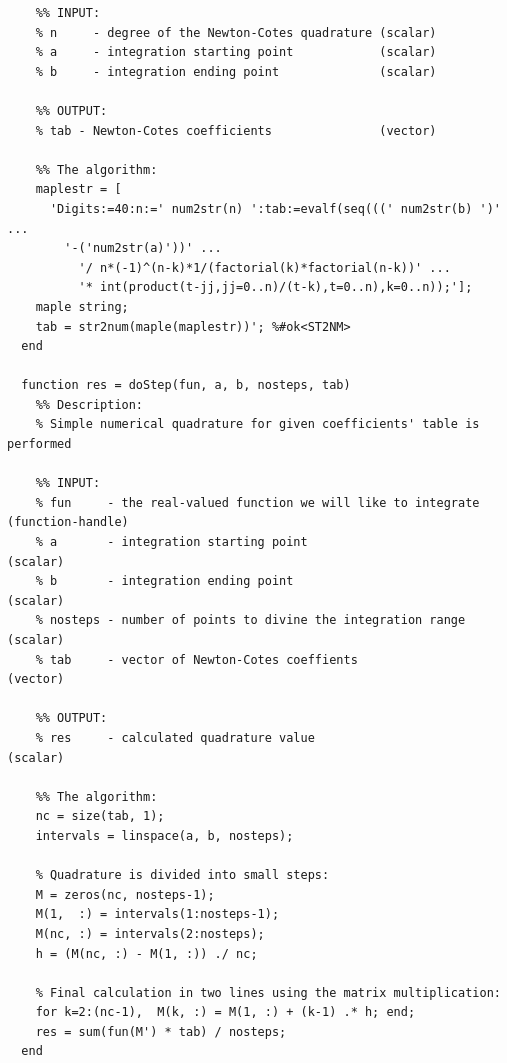 \documentclass[12pt,twoside,a4paper]{article}
\numberwithin{equation}{subsection}
\numberwithin{figure}{subsection}
\begin{document}
\begin{lstlisting}
    %% INPUT:
    % n     - degree of the Newton-Cotes quadrature (scalar) 
    % a     - integration starting point            (scalar)
    % b     - integration ending point              (scalar)

    %% OUTPUT:
    % tab - Newton-Cotes coefficients               (vector)

    %% The algorithm:
    maplestr = [
      'Digits:=40:n:=' num2str(n) ':tab:=evalf(seq(((' num2str(b) ')' ...
        '-('num2str(a)'))' ...
          '/ n*(-1)^(n-k)*1/(factorial(k)*factorial(n-k))' ...
          '* int(product(t-jj,jj=0..n)/(t-k),t=0..n),k=0..n));'];
    maple string;
    tab = str2num(maple(maplestr))'; %#ok<ST2NM>
  end
	
  function res = doStep(fun, a, b, nosteps, tab)
    %% Description:
    % Simple numerical quadrature for given coefficients' table is performed

    %% INPUT:
    % fun     - the real-valued function we will like to integrate (function-handle)
    % a       - integration starting point                         (scalar)
    % b       - integration ending point                           (scalar)
    % nosteps - number of points to divine the integration range   (scalar)
    % tab     - vector of Newton-Cotes coeffients                  (vector) 

    %% OUTPUT:
    % res     - calculated quadrature value                        (scalar)

    %% The algorithm:
    nc = size(tab, 1);
    intervals = linspace(a, b, nosteps);

    % Quadrature is divided into small steps:
    M = zeros(nc, nosteps-1);
    M(1,  :) = intervals(1:nosteps-1);
    M(nc, :) = intervals(2:nosteps);
    h = (M(nc, :) - M(1, :)) ./ nc;

    % Final calculation in two lines using the matrix multiplication:
    for k=2:(nc-1),  M(k, :) = M(1, :) + (k-1) .* h; end;
    res = sum(fun(M') * tab) / nosteps;
  end
\end{lstlisting}
\end{document}
